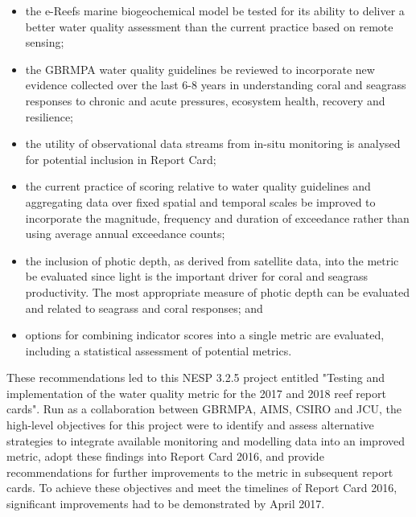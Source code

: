 \begin{itemize}
\item the e-Reefs marine biogeochemical model be tested for its ability to deliver a better water quality assessment than the current practice based on remote sensing;
\item the GBRMPA water quality guidelines be reviewed to incorporate new evidence collected over the last 6-8 years in understanding coral and seagrass responses to chronic and acute pressures, ecosystem health, recovery and resilience;
\item the utility of observational data streams from in-situ monitoring is analysed for potential inclusion in Report Card;
\item the current practice of scoring relative to water quality guidelines and aggregating data over fixed spatial and temporal scales be improved to incorporate the magnitude, frequency and duration of exceedance rather than using average annual exceedance counts;
\item the inclusion of photic depth, as derived from satellite data, into the metric be evaluated since light is the important driver for coral and seagrass productivity. The most appropriate measure of photic depth can be evaluated and related to seagrass and coral responses; and
\item options for combining indicator scores into a single metric are evaluated, including a statistical assessment of potential metrics.
\end{itemize}

These recommendations led to this NESP 3.2.5 project entitled "Testing and implementation of the
water quality metric for the 2017 and 2018 reef report cards". Run as a collaboration between
GBRMPA, AIMS, CSIRO and JCU, the high-level objectives for this project were to identify and assess
alternative strategies to integrate available monitoring and modelling data into an improved metric,
adopt these findings into Report Card 2016, and provide recommendations for further improvements to
the metric in subsequent report cards. To achieve these objectives and meet the timelines of Report
Card 2016, significant improvements had to be demonstrated by April 2017.
